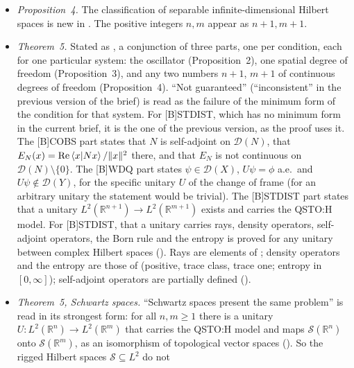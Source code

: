 \documentclass[11pt]{article}
\begin{document}
\begin{itemize}
  multiplication by $g(y)$ follows from $U(a\psi) = (a \circ g)\,U\psi$ for every measurable
  $a$ (). It differs from $Y$ because $U\psi \in U\,\mathcal{D}(X)$
  but $U\psi \notin \mathcal{D}(Y)$. Mathlib has no error function;  is defined in
  .
\item \emph{Proposition~4.} The classification of separable infinite-dimensional Hilbert spaces
  is new in . The positive integers $n, m$ appear as $n + 1, m + 1$.
\item \emph{Theorem~5.} Stated as , a conjunction of three parts, one per
  condition, each for one particular system: the oscillator (Proposition~2), one spatial
  degree of freedom (Proposition~3), and any two numbers $n+1$, $m+1$ of continuous degrees
  of freedom (Proposition~4). ``Not guaranteed'' (``inconsistent'' in the previous version of
  the brief) is read as the failure of the minimum form of the condition for that system. For
  [B]STDIST, which has no minimum form in the current brief, it is the one of the previous
  version, as the proof uses it. The [B]COBS part states that $N$ is self-adjoint on
  $\mathcal{D}(N)$, that $E_N(x) = \operatorname{Re}\braket{x|Nx}/\|x\|^2$ there, and that
  $E_N$ is not continuous on $\mathcal{D}(N)\setminus\{0\}$. The [B]WDQ part states
  $\psi \in \mathcal{D}(X)$, $U\psi = \phi$ a.e.\ and $U\psi \notin \mathcal{D}(Y)$, for the
  specific unitary $U$ of the change of frame (for an arbitrary unitary the statement would
  be trivial). The [B]STDIST part states that a unitary $L^2(\mathbb{R}^{n+1}) \to
  L^2(\mathbb{R}^{m+1})$ exists and carries the QSTO:H model. For [B]STDIST, that a
  unitary carries rays, density operators, self-adjoint operators, the Born rule and the
  entropy is proved for any unitary between complex Hilbert spaces ().
  Rays are elements of ; density operators and the entropy are those
  of  (positive, trace class, trace one; entropy in $[0,\infty]$);
  self-adjoint operators are partially defined ().
\item \emph{Theorem~5, Schwartz spaces.} ``Schwartz spaces present the same problem'' is read
  in its strongest form: for all $n, m \ge 1$ there is a unitary $U\colon L^2(\mathbb{R}^n)
  \to L^2(\mathbb{R}^m)$ that carries the QSTO:H model and maps $\mathcal{S}(\mathbb{R}^n)$
  onto $\mathcal{S}(\mathbb{R}^m)$, as an isomorphism of topological vector spaces
  (). So the rigged Hilbert spaces $\mathcal{S} \subseteq L^2$ do not

\end{itemize}
\end{document}

